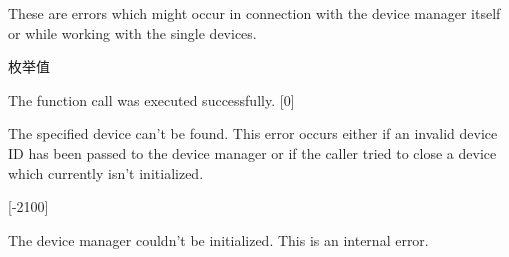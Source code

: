 These are errors which might occur in connection with the device manager itself or while working with the single devices. \begin{Desc}
\item[枚举值]\par
\begin{description}
\item[{\em 
\hypertarget{group___common_interface_gga112225e5fbaaaef6445ff4ebf98f8e03a6b0b4c7f71673b07433101a24fbcccbc}{D\+M\+R\+\_\+\+N\+O\+\_\+\+E\+R\+R\+O\+R}\label{group___common_interface_gga112225e5fbaaaef6445ff4ebf98f8e03a6b0b4c7f71673b07433101a24fbcccbc}
}]The function call was executed successfully. {\bfseries }\mbox{[}0\mbox{]} \item[{\em 
\hypertarget{group___common_interface_gga112225e5fbaaaef6445ff4ebf98f8e03aa7341c4484afaeab28ae5bd0dacfe5ee}{D\+M\+R\+\_\+\+D\+E\+V\+\_\+\+N\+O\+T\+\_\+\+F\+O\+U\+N\+D}\label{group___common_interface_gga112225e5fbaaaef6445ff4ebf98f8e03aa7341c4484afaeab28ae5bd0dacfe5ee}
}]The specified device can't be found. This error occurs either if an invalid device I\+D has been passed to the device manager or if the caller tried to close a device which currently isn't initialized.

{\bfseries }\mbox{[}-\/2100\mbox{]} \item[{\em 
\hypertarget{group___common_interface_gga112225e5fbaaaef6445ff4ebf98f8e03a7d88606ce317afec5e746109d77ebf30}{D\+M\+R\+\_\+\+I\+N\+I\+T\+\_\+\+F\+A\+I\+L\+E\+D}\label{group___common_interface_gga112225e5fbaaaef6445ff4ebf98f8e03a7d88606ce317afec5e746109d77ebf30}
}]The device manager couldn't be initialized. This is an internal error.


\end{description}
\end{Desc}
